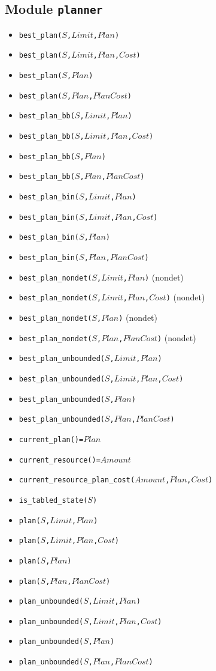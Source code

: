 \documentclass[10pt]{article}
\begin{document}
\begin{multicols}{2}
\section*{Module \texttt{planner}}  
\begin{scriptsize}
\begin{itemize}
\item \texttt{best\_plan($S$,$Limit$,$Plan$)}
\item \texttt{best\_plan($S$,$Limit$,$Plan$,$Cost$)}
\item \texttt{best\_plan($S$,$Plan$)}
\item \texttt{best\_plan($S$,$Plan$,$PlanCost$)}
\item \texttt{best\_plan\_bb($S$,$Limit$,$Plan$)}
\item \texttt{best\_plan\_bb($S$,$Limit$,$Plan$,$Cost$)}
\item \texttt{best\_plan\_bb($S$,$Plan$)}
\item \texttt{best\_plan\_bb($S$,$Plan$,$PlanCost$)}
\item \texttt{best\_plan\_bin($S$,$Limit$,$Plan$)}
\item \texttt{best\_plan\_bin($S$,$Limit$,$Plan$,$Cost$)}
\item \texttt{best\_plan\_bin($S$,$Plan$)}
\item \texttt{best\_plan\_bin($S$,$Plan$,$PlanCost$)}
\item \texttt{best\_plan\_nondet($S$,$Limit$,$Plan$)} (nondet)
\item \texttt{best\_plan\_nondet($S$,$Limit$,$Plan$,$Cost$)} (nondet)
\item \texttt{best\_plan\_nondet($S$,$Plan$)} (nondet)
\item \texttt{best\_plan\_nondet($S$,$Plan$,$PlanCost$)} (nondet)
\item \texttt{best\_plan\_unbounded($S$,$Limit$,$Plan$)}
\item \texttt{best\_plan\_unbounded($S$,$Limit$,$Plan$,$Cost$)}
\item \texttt{best\_plan\_unbounded($S$,$Plan$)}
\item \texttt{best\_plan\_unbounded($S$,$Plan$,$PlanCost$)}
\item \texttt{current\_plan()=$Plan$}
\item \texttt{current\_resource()=$Amount$}
\item \texttt{current\_resource\_plan\_cost($Amount$,$Plan$,$Cost$)}
\item \texttt{is\_tabled\_state($S$)}
\item \texttt{plan($S$,$Limit$,$Plan$)}
\item \texttt{plan($S$,$Limit$,$Plan$,$Cost$)}
\item \texttt{plan($S$,$Plan$)}
\item \texttt{plan($S$,$Plan$,$PlanCost$)}
\item \texttt{plan\_unbounded($S$,$Limit$,$Plan$)}
\item \texttt{plan\_unbounded($S$,$Limit$,$Plan$,$Cost$)}
\item \texttt{plan\_unbounded($S$,$Plan$)}
\item \texttt{plan\_unbounded($S$,$Plan$,$PlanCost$)}
\end{itemize}
\end{scriptsize}

\end{multicols}
\end{document}
